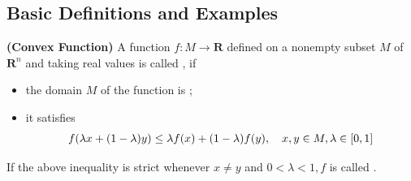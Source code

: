 \documentclass{article}
\newcommand{\bfs}[1]{\textbf{({#1}) }}
\begin{document}
\subsection{Basic Definitions and Examples}
\begin{defa}{\bfs{Convex Function}}
  A function $f: M \rightarrow \mathbf{R}$ defined on a nonempty subset $M$ of $\mathbf{R}^{n}$ and taking real values is called , if
\begin{itemize}
    \item the domain $M$ of the function is ;
    \item it satisfies \begin{align}\vspace{-0.4cm}\begin{aligned}
      f(\lambda x+(1-\lambda) y) \le \lambda f(x)+(1-\lambda) f(y), \quad x, y \in M, \lambda \in[0,1]\label{eq:con_f}
      \end{aligned}
\end{align}
\end{itemize}
If the above inequality is strict whenever $x \neq y$ and $0<\lambda<1, f$ is called .
\end{defa}
\end{document}
